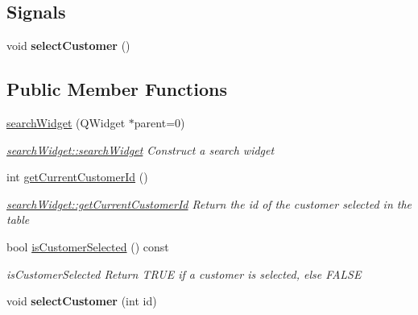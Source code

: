 \subsection*{Signals}
\begin{DoxyCompactItemize}
\item 
\hypertarget{classGui_1_1Widgets_1_1searchWidget_a9b6248c515bac4b6f58237c2f73d804b}{void {\bfseries select\-Customer} ()}\label{classGui_1_1Widgets_1_1searchWidget_a9b6248c515bac4b6f58237c2f73d804b}

\end{DoxyCompactItemize}
\subsection*{Public Member Functions}
\begin{DoxyCompactItemize}
\item 
\hyperlink{classGui_1_1Widgets_1_1searchWidget_a8d77bcf326543f841d1c05fe9819183f}{search\-Widget} (Q\-Widget $\ast$parent=0)
\begin{DoxyCompactList}\small\item\em \hyperlink{classGui_1_1Widgets_1_1searchWidget_a8d77bcf326543f841d1c05fe9819183f}{search\-Widget\-::search\-Widget} Construct a search widget \end{DoxyCompactList}\item 
int \hyperlink{classGui_1_1Widgets_1_1searchWidget_a93c6519cc7e0d8f440451d14fb85bd31}{get\-Current\-Customer\-Id} ()
\begin{DoxyCompactList}\small\item\em \hyperlink{classGui_1_1Widgets_1_1searchWidget_a93c6519cc7e0d8f440451d14fb85bd31}{search\-Widget\-::get\-Current\-Customer\-Id} Return the id of the customer selected in the table \end{DoxyCompactList}\item 
bool \hyperlink{classGui_1_1Widgets_1_1searchWidget_a3cb27e088874c5b8c548d0346a5d85f2}{is\-Customer\-Selected} () const 
\begin{DoxyCompactList}\small\item\em is\-Customer\-Selected Return T\-R\-U\-E if a customer is selected, else F\-A\-L\-S\-E \end{DoxyCompactList}\item 
\hypertarget{classGui_1_1Widgets_1_1searchWidget_a96ba18927785257377dcd3701d41e8d1}{void {\bfseries select\-Customer} (int id)}\label{classGui_1_1Widgets_1_1searchWidget_a96ba18927785257377dcd3701d41e8d1}

\end{DoxyCompactItemize}


